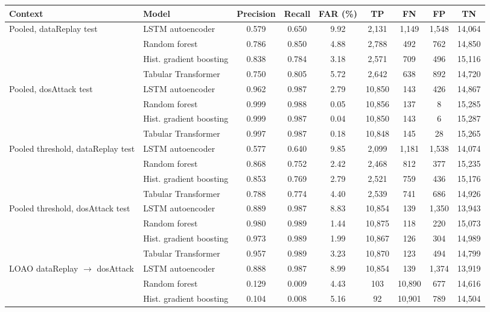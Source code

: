 \begin{tabular}{llccccccc}
\toprule
Context & Model & Precision & Recall & FAR (\%) & TP & FN & FP & TN \\
\midrule
Pooled, dataReplay test & LSTM autoencoder & 0.579 & 0.650 & 9.92 & 2{,}131 & 1{,}149 & 1{,}548 & 14{,}064 \\
 & Random forest & 0.786 & 0.850 & 4.88 & 2{,}788 & 492 & 762 & 14{,}850 \\
 & Hist. gradient boosting & 0.838 & 0.784 & 3.18 & 2{,}571 & 709 & 496 & 15{,}116 \\
 & Tabular Transformer & 0.750 & 0.805 & 5.72 & 2{,}642 & 638 & 892 & 14{,}720 \\
\midrule
Pooled, dosAttack test & LSTM autoencoder & 0.962 & 0.987 & 2.79 & 10{,}850 & 143 & 426 & 14{,}867 \\
 & Random forest & 0.999 & 0.988 & 0.05 & 10{,}856 & 137 & 8 & 15{,}285 \\
 & Hist. gradient boosting & 0.999 & 0.987 & 0.04 & 10{,}850 & 143 & 6 & 15{,}287 \\
 & Tabular Transformer & 0.997 & 0.987 & 0.18 & 10{,}848 & 145 & 28 & 15{,}265 \\
\midrule
Pooled threshold, dataReplay test & LSTM autoencoder & 0.577 & 0.640 & 9.85 & 2{,}099 & 1{,}181 & 1{,}538 & 14{,}074 \\
 & Random forest & 0.868 & 0.752 & 2.42 & 2{,}468 & 812 & 377 & 15{,}235 \\
 & Hist. gradient boosting & 0.853 & 0.769 & 2.79 & 2{,}521 & 759 & 436 & 15{,}176 \\
 & Tabular Transformer & 0.788 & 0.774 & 4.40 & 2{,}539 & 741 & 686 & 14{,}926 \\
\midrule
Pooled threshold, dosAttack test & LSTM autoencoder & 0.889 & 0.987 & 8.83 & 10{,}854 & 139 & 1{,}350 & 13{,}943 \\
 & Random forest & 0.980 & 0.989 & 1.44 & 10{,}875 & 118 & 220 & 15{,}073 \\
 & Hist. gradient boosting & 0.973 & 0.989 & 1.99 & 10{,}867 & 126 & 304 & 14{,}989 \\
 & Tabular Transformer & 0.957 & 0.989 & 3.23 & 10{,}870 & 123 & 494 & 14{,}799 \\
\midrule
LOAO dataReplay $\rightarrow$ dosAttack & LSTM autoencoder & 0.888 & 0.987 & 8.99 & 10{,}854 & 139 & 1{,}374 & 13{,}919 \\
 & Random forest & 0.129 & 0.009 & 4.43 & 103 & 10{,}890 & 677 & 14{,}616 \\
 & Hist. gradient boosting & 0.104 & 0.008 & 5.16 & 92 & 10{,}901 & 789 & 14{,}504 \\

\end{tabular}
